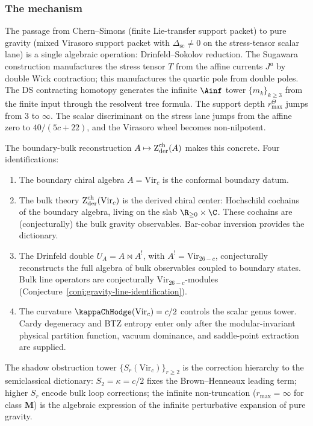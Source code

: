 \subsubsection*{The mechanism}

The passage from Chern--Simons (finite Lie-transfer support packet) to
pure gravity (mixed Virasoro support packet with
\(\Delta_{\mathrm{sc}}\ne0\) on the stress-tensor scalar lane) is a
single algebraic operation:
Drinfeld--Sokolov reduction. The Sugawara construction manufactures the stress tensor
$T$ from the affine currents $J^a$ by double Wick contraction;
this manufactures the quartic pole from double poles. The
DS contracting homotopy generates the infinite $\Ainf$ tower
$\{m_k\}_{k \ge 3}$ from the finite input through the resolvent
tree formula. The support depth \(r^\Theta_{\max}\) jumps from
$3$ to $\infty$.
The scalar discriminant on the stress lane jumps from the affine zero
to \(40/(5c+22)\), and the Virasoro wheel becomes non-nilpotent.

The boundary-bulk reconstruction $A \mapsto \operatorname{Z}_{\mathrm{der}}^{\mathrm{ch}}(A)$
makes this concrete. Four identifications:
\begin{enumerate}[label=\textup{(\alph*)},leftmargin=*]
\item The boundary chiral algebra $A = \mathrm{Vir}_c$ is the
 conformal boundary datum.
\item The bulk theory $\operatorname{Z}_{\mathrm{der}}^{\mathrm{ch}}(\mathrm{Vir}_c)$
 is the derived chiral center: Hochschild cochains of the
 boundary algebra, living on the slab
 $\R_{\ge 0} \times \C$. These cochains are (conjecturally)
 the bulk gravity observables. Bar-cobar inversion provides the
 dictionary.
\item The Drinfeld double $U_A = A \bowtie A^!$, with
 $A^! = \mathrm{Vir}_{26-c}$, conjecturally reconstructs the full algebra of
 bulk observables coupled to boundary states. Bulk line
 operators are conjecturally $\mathrm{Vir}_{26-c}$-modules
 (Conjecture~\ref{conj:gravity-line-identification}).
\item The curvature $\kappaChHodge(\mathrm{Vir}_c) = c/2$ controls
 the scalar genus tower. Cardy degeneracy and BTZ entropy enter
 only after the modular-invariant physical partition function,
 vacuum dominance, and saddle-point extraction are supplied.
\end{enumerate}
The shadow obstruction tower $\{S_r(\mathrm{Vir}_c)\}_{r \ge 2}$
is the correction hierarchy to the semiclassical dictionary:
$S_2 = \kappa = c/2$ fixes the Brown--Henneaux leading term;
higher $S_r$ encode bulk loop corrections; the infinite
non-truncation ($r_{\max} = \infty$ for class $\mathbf{M}$)
is the algebraic expression of the infinite perturbative
expansion of pure gravity.

